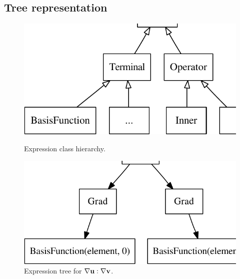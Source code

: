 \subsection{Tree representation}

\begin{figure}[t]
\begin{minipage}[b]{0.47\linewidth}
\centering
\includegraphics[width=1.0\largefig]{chapters/alnes-1/pdf/expr.pdf}
\caption{Expression class hierarchy.}
\label{ufl:fig:expr}
\end{minipage}
\hspace{0.73cm}
\begin{minipage}[b]{0.49\linewidth}
\centering
\includegraphics[width=\largefig]{chapters/alnes-1/pdf/stiffness.pdf}
\caption{Expression tree for $\nabla \mathbf{u} : \nabla \mathbf{v}$.}
\label{ufl:fig:stiffness}
\end{minipage}
\end{figure}

